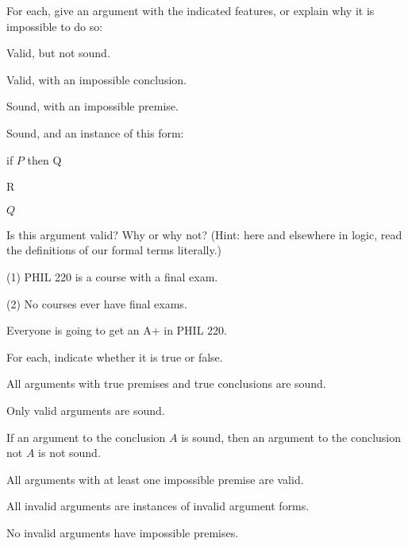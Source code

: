 \problempart
\label{hw1.C}
For each, give an argument with the indicated features, or explain why it is impossible to do so:
	\begin{earg}
		\item Valid, but not sound.
		\item Valid, with an impossible conclusion.
		\item Sound, with an impossible premise.
		\item Sound, and an instance of this form:
			\begin{earg}
				\item[] if $P$ then Q
				\item[] R
				\item[\therefore] $Q$
			\end{earg}
	\end{earg}


\problempart
\label{pr.ImpossiblePremises}
Is this argument valid? Why or why not? (Hint: here and elsewhere in logic, read the definitions of our formal terms literally.)
\begin{earg}
\item[(1)] PHIL 220 is a course with a final exam.
\item[(2)] No courses ever have final exams.
\item[\therefore] Everyone is going to get an A+ in PHIL 220.
\end{earg}

\problempart
\label{hw1.A}
For each, indicate whether it is true or false.
	\begin{earg}
		\item All arguments with true premises and true conclusions are sound.
		\item Only valid arguments are sound.
		\item If an argument to the conclusion $A$ is sound, then an argument to the conclusion not $A$ is not sound.
		\item All arguments with at least one impossible premise are valid.
		\item All invalid arguments are instances of invalid argument forms.
		\item No invalid arguments have impossible premises.
	\end{earg}
